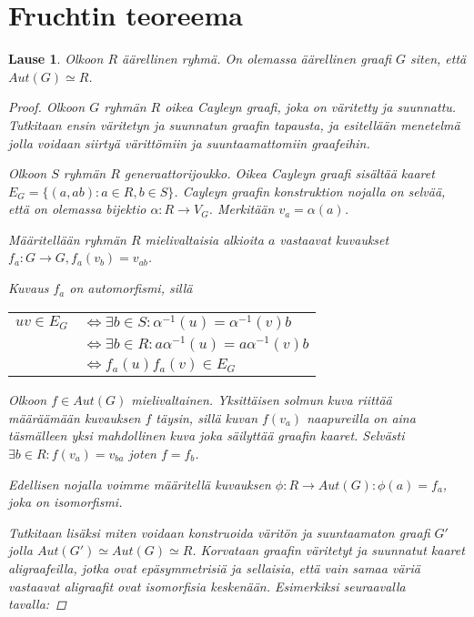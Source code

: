 \documentclass[a4paper, 12pt]{article}
\theoremstyle{definition}
\theoremstyle{plain}
\newtheorem{teor}[mydef]{Lause}
\begin{document}
\newpage

\section{Fruchtin teoreema}

\begin{teor}
Olkoon $R$ äärellinen ryhmä. On olemassa äärellinen graafi $G$ siten, että $Aut(G) \simeq R$.
\begin{proof}

Olkoon $G$ ryhmän $R$ oikea Cayleyn graafi, joka on väritetty ja suunnattu. Tutkitaan ensin väritetyn ja suunnatun graafin tapausta, ja esitellään menetelmä jolla voidaan siirtyä värittömiin ja suuntaamattomiin graafeihin.

Olkoon $S$ ryhmän $R$ generaattorijoukko. Oikea Cayleyn graafi sisältää kaaret $E_G = \{ (a, ab) : a \in R, b \in S\}$. Cayleyn graafin konstruktion nojalla on selvää, että on olemassa bijektio $\alpha: R \rightarrow V_G$. Merkitään $v_a = \alpha(a)$.

Määritellään ryhmän $R$ mielivaltaisia alkioita $a$ vastaavat kuvaukset $f_a: G \rightarrow G, f_a(v_b) = v_{ab}$.

Kuvaus $f_a$ on automorfismi, sillä
\begin{center}
\begin{tabular}{r l}
$uv \in E_G$ & $\Leftrightarrow \exists b \in S: \alpha^{-1}(u) = \alpha^{-1}(v)b$ \\
& $\Leftrightarrow \exists b \in R: a\alpha^{-1}(u) = a\alpha^{-1}(v)b$ \\
& $\Leftrightarrow f_a(u)f_a(v) \in E_G$\\
\end{tabular}
\end{center}

Olkoon $f \in Aut(G)$ mielivaltainen. Yksittäisen solmun kuva riittää määräämään kuvauksen $f$ täysin, sillä kuvan $f(v_a)$ naapureilla on aina täsmälleen yksi mahdollinen kuva joka säilyttää graafin kaaret. Selvästi $\exists b \in R: f(v_a) = v_{ba}$ joten $f = f_b$.

Edellisen nojalla voimme määritellä kuvauksen $\phi: R \rightarrow Aut(G): \phi(a) = f_a$, joka on isomorfismi.

Tutkitaan lisäksi miten voidaan konstruoida väritön ja suuntaamaton graafi $G'$ jolla $Aut(G') \simeq Aut(G) \simeq R$. 
Korvataan graafin väritetyt ja suunnatut kaaret aligraafeilla, jotka ovat epäsymmetrisiä ja sellaisia, että vain samaa väriä vastaavat aligraafit ovat isomorfisia keskenään. Esimerkiksi seuraavalla tavalla:


\end{proof}
\end{teor}
\end{document}

